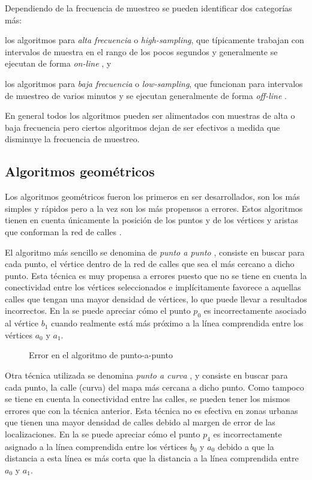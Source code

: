 Dependiendo de la frecuencia de muestreo se pueden identificar dos categorías más: \begin{enumerate*}[1)] \item los algoritmos para \emph{alta frecuencia} o \emph{high-sampling}, que típicamente trabajan con intervalos de muestra en el rango de los pocos segundos y generalmente se ejecutan de forma \emph{on-line} \cite{greenfeld2002matching,quddus2003general,quddus2006high}, y \item los algoritmos para \emph{baja frecuencia} o \emph{low-sampling},  que funcionan para intervalos de muestreo de varios minutos y se ejecutan generalmente de forma \emph{off-line} \cite{lou2009map,yuan2010interactive}. \end{enumerate*} En general todos los algoritmos pueden ser alimentados con muestras de alta o baja frecuencia pero ciertos algoritmos dejan de ser efectivos a medida que disminuye la frecuencia de muestreo.

\subsection{Algoritmos geométricos}

Los algoritmos geométricos fueron los primeros en ser desarrollados, son los más simples y rápidos pero a la vez son los más propensos a errores. Estos algoritmos tienen en cuenta únicamente la posición de los puntos y de los vértices y aristas que conforman la red de calles \cite{quddus2007current}.

El algoritmo más sencillo se denomina de \emph{punto a punto} \cite{white2000some}, consiste en buscar para cada punto, el vértice dentro de la red de calles que sea el más cercano a dicho punto. Esta técnica es muy propensa a errores puesto que no se tiene en cuenta la conectividad entre los vértices seleccionados e implícitamente favorece a aquellas calles que tengan una mayor densidad de vértices, lo que puede llevar a resultados incorrectos. En la  se puede apreciar cómo el punto $p_0$ es incorrectamente asociado al vértice $b_1$ cuando realmente está más próximo a la línea comprendida entre los vértices $a_0$ y $a_1$.

\begin{figure}[h]
	\centering
	
	\caption{Error en el algoritmo de punto-a-punto}
	\label{fig:punto-a-punto} 
\end{figure}

Otra técnica utilizada se denomina \emph{punto a curva} \cite{white2000some}, y consiste en buscar para cada punto, la calle (curva) del mapa más cercana a dicho punto. Como tampoco se tiene en cuenta la conectividad entre las calles, se pueden tener los mismos errores que con la técnica anterior. Esta técnica no es efectiva en zonas urbanas que tienen una mayor densidad de calles debido al margen de error de las localizaciones. En la  se puede apreciar cómo el punto $p_4$ es incorrectamente asignado a la línea comprendida entre los vértices $b_0$ y $a_0$ debido a que la distancia a esta línea es más corta que la distancia a la línea comprendida entre $a_0$ y $a_1$.


